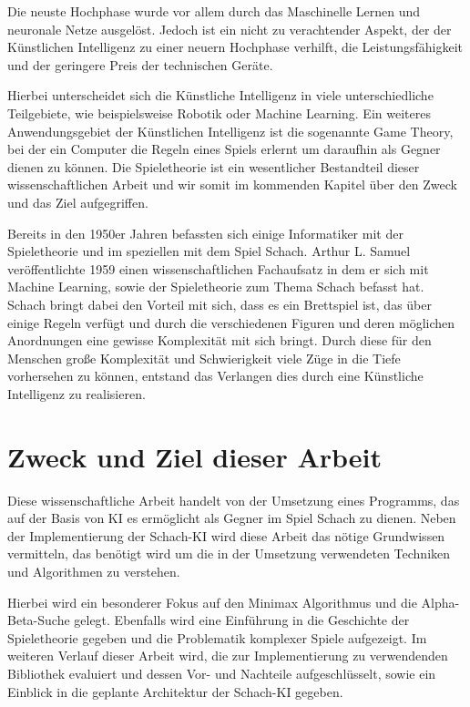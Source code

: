 
Die neuste Hochphase wurde vor allem durch das Maschinelle Lernen und neuronale Netze ausgelöst. Jedoch ist ein nicht zu verachtender Aspekt, der der Künstlichen Intelligenz zu einer neuern Hochphase verhilft, die Leistungsfähigkeit und der geringere Preis der technischen Geräte. 

Hierbei unterscheidet sich die Künstliche Intelligenz in viele unterschiedliche Teilgebiete, wie beispielsweise Robotik oder Machine Learning. Ein weiteres Anwendungsgebiet der Künstlichen Intelligenz ist die sogenannte Game Theory, bei der ein Computer die Regeln eines Spiels erlernt um daraufhin als Gegner dienen zu können. Die Spieletheorie ist ein wesentlicher Bestandteil dieser wissenschaftlichen Arbeit und wir somit im kommenden Kapitel über den Zweck und das Ziel aufgegriffen.

Bereits in den 1950er Jahren befassten sich einige Informatiker mit der Spieletheorie und im speziellen mit dem Spiel Schach. Arthur L. Samuel veröffentlichte 1959 einen wissenschaftlichen Fachaufsatz in dem er sich mit Machine Learning, sowie der Spieletheorie zum Thema Schach befasst hat.\cite{Samuel1959} Schach bringt dabei den Vorteil mit sich, dass es ein Brettspiel ist, das über einige Regeln verfügt und durch die verschiedenen Figuren und deren möglichen Anordnungen eine gewisse Komplexität mit sich bringt. Durch diese für den Menschen große Komplexität und Schwierigkeit viele Züge in die Tiefe vorhersehen zu können, entstand das Verlangen dies durch eine Künstliche Intelligenz zu realisieren.

\section{Zweck und Ziel dieser Arbeit}
Diese wissenschaftliche Arbeit handelt von der Umsetzung eines Programms, das auf der Basis von KI es ermöglicht als Gegner im Spiel Schach zu dienen. Neben der Implementierung der Schach-KI wird diese Arbeit das nötige Grundwissen vermitteln, das benötigt wird um die in der Umsetzung verwendeten Techniken und Algorithmen zu verstehen. 

Hierbei wird ein besonderer Fokus auf den Minimax Algorithmus und die Alpha-Beta-Suche gelegt. Ebenfalls wird eine Einführung in die Geschichte der Spieletheorie gegeben und die Problematik komplexer Spiele aufgezeigt. Im weiteren Verlauf dieser Arbeit wird, die zur Implementierung zu verwendenden Bibliothek evaluiert und dessen Vor- und Nachteile aufgeschlüsselt, sowie ein Einblick in die geplante Architektur der Schach-KI gegeben.

